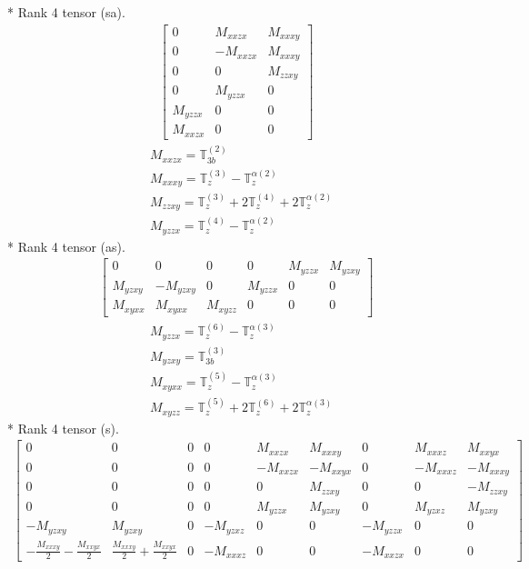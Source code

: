 \documentclass[fleqn,8pt,landscape]{jsarticle}
\begin{document}
* Rank 4 tensor (sa).
\begin{align*}
\begin{bmatrix} 0 & M_{xxzx} & M_{xxxy} \\ 0 & - M_{xxzx} & M_{xxxy} \\ 0 & 0 & M_{zzxy} \\ 0 & M_{yzzx} & 0 \\ M_{yzzx} & 0 & 0 \\ M_{xxzx} & 0 & 0 \end{bmatrix}
\end{align*}
\begin{align*}
& M_{xxzx} = \mathbb{T}_{3b}^{(2)} \\
& M_{xxxy} = \mathbb{T}_{z}^{(3)} - \mathbb{T}_{z}^{\alpha(2)} \\
& M_{zzxy} = \mathbb{T}_{z}^{(3)} + 2 \mathbb{T}_{z}^{(4)} + 2 \mathbb{T}_{z}^{\alpha(2)} \\
& M_{yzzx} = \mathbb{T}_{z}^{(4)} - \mathbb{T}_{z}^{\alpha(2)}
\end{align*}
* Rank 4 tensor (as).
\begin{align*}
\begin{bmatrix} 0 & 0 & 0 & 0 & M_{yzzx} & M_{yzxy} \\ M_{yzxy} & - M_{yzxy} & 0 & M_{yzzx} & 0 & 0 \\ M_{xyxx} & M_{xyxx} & M_{xyzz} & 0 & 0 & 0 \end{bmatrix}
\end{align*}
\begin{align*}
& M_{yzzx} = \mathbb{T}_{z}^{(6)} - \mathbb{T}_{z}^{\alpha(3)} \\
& M_{yzxy} = \mathbb{T}_{3b}^{(3)} \\
& M_{xyxx} = \mathbb{T}_{z}^{(5)} - \mathbb{T}_{z}^{\alpha(3)} \\
& M_{xyzz} = \mathbb{T}_{z}^{(5)} + 2 \mathbb{T}_{z}^{(6)} + 2 \mathbb{T}_{z}^{\alpha(3)}
\end{align*}
* Rank 4 tensor (s).
\begin{align*}
\begin{bmatrix} 0 & 0 & 0 & 0 & M_{xxzx} & M_{xxxy} & 0 & M_{xxxz} & M_{xxyx} \\ 0 & 0 & 0 & 0 & - M_{xxzx} & - M_{xxyx} & 0 & - M_{xxxz} & - M_{xxxy} \\ 0 & 0 & 0 & 0 & 0 & M_{zzxy} & 0 & 0 & - M_{zzxy} \\ 0 & 0 & 0 & 0 & M_{yzzx} & M_{yzxy} & 0 & M_{yzxz} & M_{yzxy} \\ - M_{yzxy} & M_{yzxy} & 0 & - M_{yzxz} & 0 & 0 & - M_{yzzx} & 0 & 0 \\ - \frac{M_{xxxy}}{2} - \frac{M_{xxyx}}{2} & \frac{M_{xxxy}}{2} + \frac{M_{xxyx}}{2} & 0 & - M_{xxxz} & 0 & 0 & - M_{xxzx} & 0 & 0 \end{bmatrix}
\end{align*}
\end{document}
